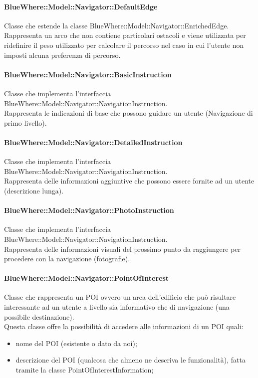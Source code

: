 \documentclass[../SpecificaTecnica.tex]{subfiles}
\begin{document}
				\paragraph{BlueWhere::Model::Navigator::DefaultEdge}
					Classe che estende la classe BlueWhere::Model::Navigator::EnrichedEdge. \\
					Rappresenta un arco che non contiene particolari ostacoli e viene utilizzata per ridefinire il peso utilizzato per calcolare il percorso nel caso in cui l'utente non imposti alcuna preferenza di percorso.
				\paragraph{BlueWhere::Model::Navigator::BasicInstruction}
					Classe che implementa l'interfaccia BlueWhere::Model::Navigator::NavigationInstruction. \\
					Rappresenta le indicazioni di base che possono guidare un utente (Navigazione di primo livello).
				\paragraph{BlueWhere::Model::Navigator::DetailedInstruction}
					Classe che implementa l'interfaccia BlueWhere::Model::Navigator::NavigationInstruction. \\
					Rappresenta delle informazioni aggiuntive che possono essere fornite ad un utente (descrizione lunga).
				\paragraph{BlueWhere::Model::Navigator::PhotoInstruction}
					Classe che implementa l'interfaccia BlueWhere::Model::Navigator::NavigationInstruction. \\
					Rappresenta delle informazioni visuali del prossimo punto da raggiungere per procedere con la navigazione (fotografie).
				\paragraph{BlueWhere::Model::Navigator::PointOfInterest}
					Classe che rappresenta un POI ovvero un area dell'edificio che può risultare interessante ad un utente a livello sia informativo che di navigazione (una possibile destinazione). \\
					Questa classe offre la possibilità di accedere alle informazioni di un POI quali:
					\begin{itemize}
						\item nome del POI (esistente o dato da noi);
						\item descrizione del POI (qualcosa che almeno ne descriva le funzionalità), fatta tramite la classe PointOfInterestInformation;
					\end{itemize}
\end{document}

